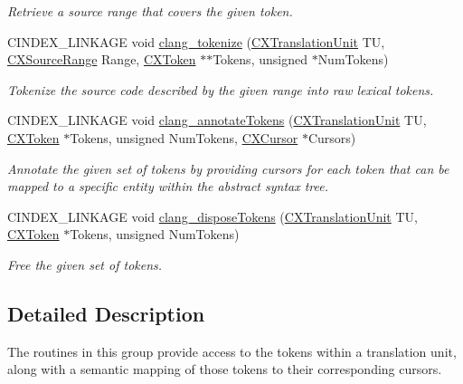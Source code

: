 \begin{DoxyCompactItemize}
\begin{DoxyCompactList}\small\item\em Retrieve a source range that covers the given token. \end{DoxyCompactList}\item 
C\+I\+N\+D\+E\+X\+\_\+\+L\+I\+N\+K\+A\+GE void \mbox{\hyperlink{group__CINDEX__LEX_ga6b315a71102d4f6c95eb68894a3bda8a}{clang\+\_\+tokenize}} (\mbox{\hyperlink{group__CINDEX_gacdb7815736ca709ce9a5e1ec2b7e16ac}{C\+X\+Translation\+Unit}} TU, \mbox{\hyperlink{structCXSourceRange}{C\+X\+Source\+Range}} Range, \mbox{\hyperlink{structCXToken}{C\+X\+Token}} $\ast$$\ast$Tokens, unsigned $\ast$Num\+Tokens)
\begin{DoxyCompactList}\small\item\em Tokenize the source code described by the given range into raw lexical tokens. \end{DoxyCompactList}\item 
C\+I\+N\+D\+E\+X\+\_\+\+L\+I\+N\+K\+A\+GE void \mbox{\hyperlink{group__CINDEX__LEX_gadc0c15904e61902b73e02700af0863a0}{clang\+\_\+annotate\+Tokens}} (\mbox{\hyperlink{group__CINDEX_gacdb7815736ca709ce9a5e1ec2b7e16ac}{C\+X\+Translation\+Unit}} TU, \mbox{\hyperlink{structCXToken}{C\+X\+Token}} $\ast$Tokens, unsigned Num\+Tokens, \mbox{\hyperlink{structCXCursor}{C\+X\+Cursor}} $\ast$Cursors)
\begin{DoxyCompactList}\small\item\em Annotate the given set of tokens by providing cursors for each token that can be mapped to a specific entity within the abstract syntax tree. \end{DoxyCompactList}\item 
\mbox{\label{group__CINDEX__LEX_gac5266f6b5fee87c433b696437cab0d13}} 
C\+I\+N\+D\+E\+X\+\_\+\+L\+I\+N\+K\+A\+GE void \mbox{\hyperlink{group__CINDEX__LEX_gac5266f6b5fee87c433b696437cab0d13}{clang\+\_\+dispose\+Tokens}} (\mbox{\hyperlink{group__CINDEX_gacdb7815736ca709ce9a5e1ec2b7e16ac}{C\+X\+Translation\+Unit}} TU, \mbox{\hyperlink{structCXToken}{C\+X\+Token}} $\ast$Tokens, unsigned Num\+Tokens)
\begin{DoxyCompactList}\small\item\em Free the given set of tokens. \end{DoxyCompactList}\end{DoxyCompactItemize}


\subsection{Detailed Description}
The routines in this group provide access to the tokens within a translation unit, along with a semantic mapping of those tokens to their corresponding cursors. 


